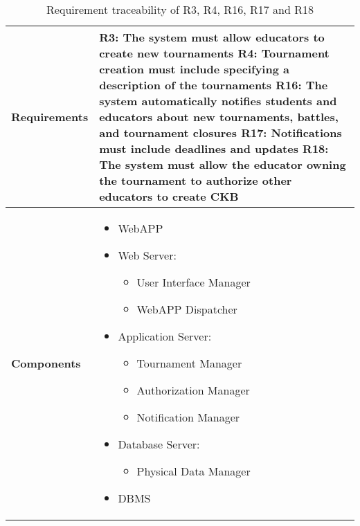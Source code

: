 \begin{table}[h!]
    \centering
    \begin{tabular}{|p{3cm}|p{12cm}|}    \hline
        \textbf{Requirements} & R3: The system must allow educators to create new tournaments \newline R4: Tournament creation must include specifying a description of the tournaments  \newline R16: The system automatically notifies students and educators about new tournaments, battles, and tournament closures \newline R17: Notifications must include deadlines and updates \newline R18: The system must allow the educator owning the tournament to authorize other educators to create CKB\\
    \hline
        \textbf{Components} & 
            \begin{itemize}
                \item WebAPP
                \item Web Server:
                \begin{itemize}
                    \item User Interface Manager 
                    \item WebAPP Dispatcher
                \end{itemize}
                \item Application Server:
                \begin{itemize}
                    \item Tournament Manager
                    \item Authorization Manager
                    \item Notification Manager
                \end{itemize}
                \item Database Server:
                 \begin{itemize}
                    \item Physical Data Manager
                \end{itemize}
                \item DBMS
            \end{itemize}    \\
        
    \hline
    \end{tabular}
    \caption{Requirement traceability of R3, R4, R16, R17 and R18}
    \label{tab:r3}
\end{table}

